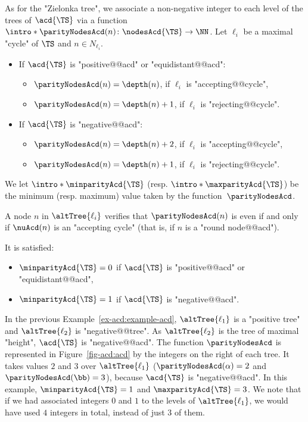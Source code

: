 \documentclass[10pt,a4paper]{amsart}
\renewcommand{\aa}{\alpha}
\begin{document}
\AP As for the "Zielonka tree", we associate a non-negative integer to each level of the trees of $\acd{\TS}$ via a function $\intro*\parityNodesAcd(n)\colon \nodesAcd{\TS} \to \NN$. Let $\ell_i$ be a maximal "cycle" of $\TS$ and $n\in N_{\ell_i}$. 
\begin{itemize}
	\item If $\acd{\TS}$ is "positive@@acd" or "equidistant@@acd": 
	\begin{itemize}
		\item $\parityNodesAcd(n) = \depth(n)$, if $\ell_i$ is "accepting@@cycle",
		\item $\parityNodesAcd(n) = \depth(n) + 1$, if $\ell_i$ is "rejecting@@cycle".
	\end{itemize}
	\item If $\acd{\TS}$ is "negative@@acd":
	\begin{itemize}
		\item $\parityNodesAcd(n) = \depth(n)+2$, if $\ell_i$ is "accepting@@cycle",
		\item $\parityNodesAcd(n) = \depth(n) + 1$, if $\ell_i$ is "rejecting@@cycle".
	\end{itemize}
\end{itemize}
\AP We let $\intro*\minparityAcd{\TS}$ (resp. $\intro*\maxparityAcd{\TS}$) be the minimum (resp. maximum) value taken by the function~$\parityNodesAcd$. 

\begin{remark}\label{rmk-acd:parity_levels_ACD}
	A node $n$ in $\altTree{\ell_i}$ verifies that $\parityNodesAcd(n)$ is even if and only if $\nuAcd(n)$ is an "accepting cycle" (that is, if $n$ is a "round node@@acd").
\end{remark}

\begin{remark}
	It is satisfied:
	\begin{itemize}
		\item $\minparityAcd{\TS}=0$ if $\acd{\TS}$ is "positive@@acd" or "equidistant@@acd",
		\item $\minparityAcd{\TS}=1$ if $\acd{\TS}$ is "negative@@acd".
	\end{itemize}	 
\end{remark}

\begin{example}
	In the previous Example~\ref{ex-acd:example-acd}, $\altTree{\ell_1}$ is a "positive tree" and $\altTree{\ell_2}$ is  "negative@@tree". As $\altTree{\ell_2}$ is the tree of maximal "height",  $\acd{\TS}$ is "negative@@acd". 
	The function $\parityNodesAcd$ is represented in Figure~\ref{fig-acd:acd} by the integers on the right of each tree. It takes values $2$ and $3$ over $\altTree{\ell_1}$ ($\parityNodesAcd(\aa)=2$ and $\parityNodesAcd(\bb)=3$), because $\acd{\TS}$ is "negative@@acd". 
	In this example, $\minparityAcd{\TS}=1$ and $\maxparityAcd{\TS}=3$.
	We note that if we had associated integers $0$ and $1$ to the levels of $\altTree{\ell_1}$, we would have used $4$ integers in total, instead of just $3$ of them.		
\end{example}
\end{document}
